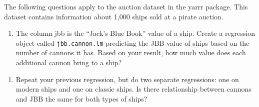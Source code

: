 \documentclass[]{book}
\newenvironment{Shaded}{\begin{snugshade}}{\end{snugshade}}
\newcommand{\KeywordTok}[1]{\textcolor[rgb]{0.13,0.29,0.53}{\textbf{#1}}}
\newcommand{\DataTypeTok}[1]{\textcolor[rgb]{0.13,0.29,0.53}{#1}}
\newcommand{\StringTok}[1]{\textcolor[rgb]{0.31,0.60,0.02}{#1}}
\newcommand{\CommentTok}[1]{\textcolor[rgb]{0.56,0.35,0.01}{\textit{#1}}}
\newcommand{\OperatorTok}[1]{\textcolor[rgb]{0.81,0.36,0.00}{\textbf{#1}}}
\newcommand{\NormalTok}[1]{#1}
\providecommand{\tightlist}{%
  \setlength{\itemsep}{0pt}\setlength{\parskip}{0pt}}
\theoremstyle{definition}
\theoremstyle{definition}
\theoremstyle{remark}
\begin{document}
The following questions apply to the auction dataset in the yarrr
package. This dataset contains information about 1,000 ships sold at a
pirate auction.

\begin{enumerate}
\def\labelenumi{\arabic{enumi}.}
\tightlist
\item
  The column jbb is the ``Jack's Blue Book'' value of a ship. Create a
  regression object called \texttt{jbb.cannon.lm} predicting the JBB
  value of ships based on the number of cannons it has. Based on your
  result, how much value does each additional cannon bring to a ship?
\end{enumerate}

\begin{Shaded}
\end{Shaded}

\begin{enumerate}
\def\labelenumi{\arabic{enumi}.}
\setcounter{enumi}{1}
\tightlist
\item
  Repeat your previous regression, but do two separate regressions: one
  on modern ships and one on classic ships. Is there relationship
  between cannons and JBB the same for both types of ships?
\end{enumerate}
\end{document}
